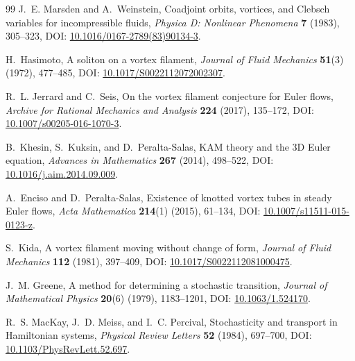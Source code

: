 \begin{thebibliography}{99}
J.~E. Marsden and A.~Weinstein,
\newblock Coadjoint orbits, vortices, and Clebsch variables for incompressible fluids,
\newblock \emph{Physica D: Nonlinear Phenomena} \textbf{7} (1983), 305--323,
\newblock DOI: \href{https://doi.org/10.1016/0167-2789(83)90134-3}{10.1016/0167-2789(83)90134-3}.

H.~Hasimoto,
\newblock A soliton on a vortex filament,
\newblock \emph{Journal of Fluid Mechanics} \textbf{51}(3) (1972), 477--485,
\newblock DOI: \href{https://doi.org/10.1017/S0022112072002307}{10.1017/S0022112072002307}.

R.~L. Jerrard and C.~Seis,
\newblock On the vortex filament conjecture for Euler flows,
\newblock \emph{Archive for Rational Mechanics and Analysis} \textbf{224} (2017), 135--172,
\newblock DOI: \href{https://doi.org/10.1007/s00205-016-1070-3}{10.1007/s00205-016-1070-3}.

B.~Khesin, S.~Kuksin, and D.~Peralta-Salas,
\newblock KAM theory and the 3D Euler equation,
\newblock \emph{Advances in Mathematics} \textbf{267} (2014), 498--522,
\newblock DOI: \href{https://doi.org/10.1016/j.aim.2014.09.009}{10.1016/j.aim.2014.09.009}.

A.~Enciso and D.~Peralta-Salas,
\newblock Existence of knotted vortex tubes in steady Euler flows,
\newblock \emph{Acta Mathematica} \textbf{214}(1) (2015), 61--134,
\newblock DOI: \href{https://doi.org/10.1007/s11511-015-0123-z}{10.1007/s11511-015-0123-z}.

S.~Kida,
\newblock A vortex filament moving without change of form,
\newblock \emph{Journal of Fluid Mechanics} \textbf{112} (1981), 397--409,
\newblock DOI: \href{https://doi.org/10.1017/S0022112081000475}{10.1017/S0022112081000475}.

J.~M. Greene,
\newblock A method for determining a stochastic transition,
\newblock \emph{Journal of Mathematical Physics} \textbf{20}(6) (1979), 1183--1201,
\newblock DOI: \href{https://doi.org/10.1063/1.524170}{10.1063/1.524170}.

R.~S. MacKay, J.~D. Meiss, and I.~C. Percival,
\newblock Stochasticity and transport in Hamiltonian systems,
\newblock \emph{Physical Review Letters} \textbf{52} (1984), 697--700,
\newblock DOI: \href{https://doi.org/10.1103/PhysRevLett.52.697}{10.1103/PhysRevLett.52.697}.


\end{thebibliography}
